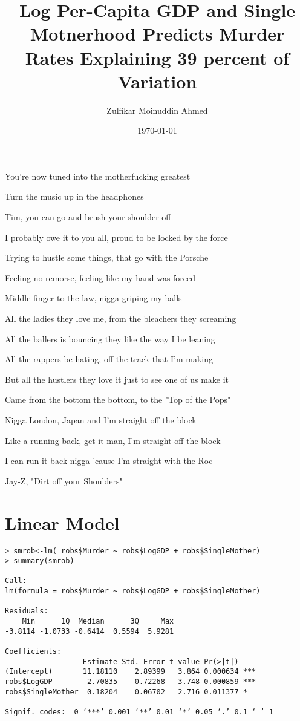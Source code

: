 \documentclass{amsart}
\title{Log Per-Capita GDP and Single Motnerhood Predicts Murder Rates Explaining 39 percent of Variation}
\author{Zulfikar Moinuddin Ahmed}
\date{\today}
\begin{document}
\maketitle

\begin{epigram}{You're now tuned into the motherfucking greatest

Turn the music up in the headphones

Tim, you can go and brush your shoulder off

I probably owe it to you all, proud to be locked by the force

Trying to hustle some things, that go with the Porsche

Feeling no remorse, feeling like my hand was forced

Middle finger to the law, nigga griping my balls

All the ladies they love me, from the bleachers they screaming

All the ballers is bouncing they like the way I be leaning

All the rappers be hating, off the track that I'm making

But all the hustlers they love it just to see one of us make it

Came from the bottom the bottom, to the "Top of the Pops"

Nigga London, Japan and I'm straight off the block

Like a running back, get it man, I'm straight off the block

I can run it back nigga 'cause I'm straight with the Roc}{Jay-Z, "Dirt off your Shoulders"}


\section{Linear Model}

\begin{verbatim}
> smrob<-lm( robs$Murder ~ robs$LogGDP + robs$SingleMother)
> summary(smrob)

Call:
lm(formula = robs$Murder ~ robs$LogGDP + robs$SingleMother)

Residuals:
    Min      1Q  Median      3Q     Max 
-3.8114 -1.0733 -0.6414  0.5594  5.9281 

Coefficients:
                  Estimate Std. Error t value Pr(>|t|)    
(Intercept)       11.18110    2.89399   3.864 0.000634 ***
robs$LogGDP       -2.70835    0.72268  -3.748 0.000859 ***
robs$SingleMother  0.18204    0.06702   2.716 0.011377 *  
---
Signif. codes:  0 ‘***’ 0.001 ‘**’ 0.01 ‘*’ 0.05 ‘.’ 0.1 ‘ ’ 1


\end{verbatim}
\end{epigram}
\end{document}
